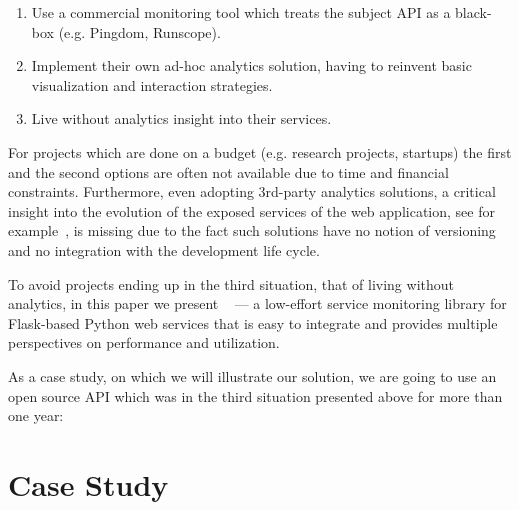 \documentclass[conference]{IEEEtran}
\begin{document}
  \begin{enumerate}

    \item Use a commercial monitoring tool which treats the subject API as a black-box (e.g. Pingdom, Runscope). 

    \item Implement their own ad-hoc analytics solution, having to reinvent basic visualization and interaction strategies. 

    \item Live without analytics insight into their services.

  \end{enumerate}


For projects which are done on a budget (e.g. research projects, startups) the first and the second options are often not available due to time and financial constraints. Furthermore, even adopting 3rd-party analytics solutions, a critical insight into the evolution of the exposed services of the web application, see for example~\cite{papazoglou2011managing}, is missing due to the fact such solutions have no notion of versioning and no integration with the development life cycle.

To avoid projects ending up in the third situation, that of living without analytics, in this paper we present \tool~ --- a low-effort service monitoring library for Flask-based Python web services that is easy to integrate and provides multiple perspectives on performance and utilization.

As a case study, on which we will illustrate our solution, we are going to use an open source API which was in the third situation presented above for more than one year:



\section{Case Study}
\end{document}
